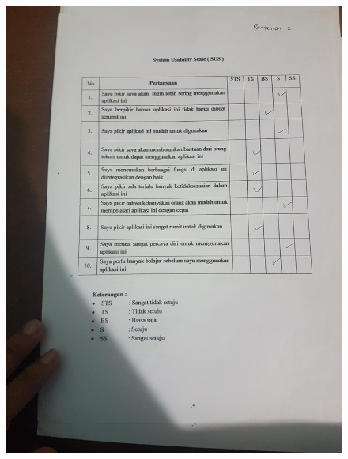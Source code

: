 \begin{figure}[H]
	\center
	\includegraphics [width = 17cm,angle=-90]{gambar/pengujian/pangkalan2}
\end{figure}
